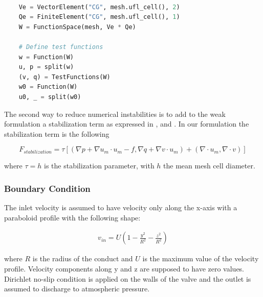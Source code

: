 \documentclass[12pt, letterpaper]{article}
\newcommand\norm[1]{\left\lVert#1\right\rVert}
\begin{document}
\begin{lstlisting}[language=Python]

	Ve = VectorElement("CG", mesh.ufl_cell(), 2)
	Qe = FiniteElement("CG", mesh.ufl_cell(), 1)
	W = FunctionSpace(mesh, Ve * Qe)

	# Define test functions
	w = Function(W)
	u, p = split(w)
	(v, q) = TestFunctions(W)
	w0 = Function(W)
	u0, _ = split(w0)

\end{lstlisting}

The second way to reduce numerical instabilities is to add to the weak formulation a stabilization term as expressed in \cite{tezduyar}, \cite{tezduyar2} and \cite{jansson_aircraft}. In our formulation the stabilization term is the following

\begin{equation}
	F_{stabilization} = \tau \left[\left(\nabla p + \nabla u_m \cdot u_m - f, \nabla q + \nabla v \cdot u_ m \right) + \left(\nabla \cdot u_m, \nabla \cdot v\right)\right]
\end{equation}

where $\tau = h$ is the stabilization parameter, with $h$ the mean mesh cell diameter.


\subsubsection{Boundary Condition}
The inlet velocity is assumed to have velocity only along the x-axis with a paraboloid profile with the following shape:

\begin{eqnarray}
	v_{in} = U(1 - \frac{y^2}{R^2} - \frac{z^2}{R^2})
	\label{eq:inlet-velocity}
\end{eqnarray}

\noindent where $R$ is the radius of the conduct and $U$ is the maximum value of the velocity profile.
Velocity components along y and z are supposed to have zero values.
Dirichlet no-slip condition is applied on the walls of the valve and the outlet is assumed to discharge to atmospheric pressure.

\end{document}
